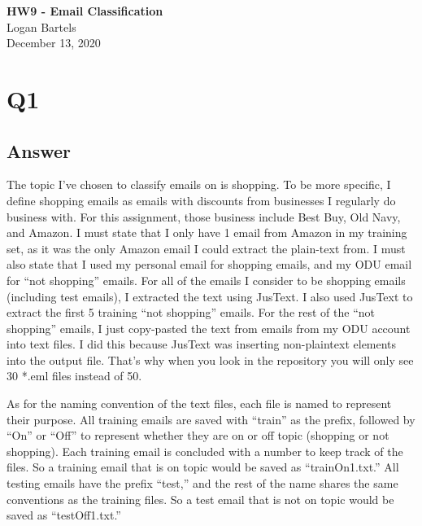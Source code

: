 \documentclass[12pt]{article}
\begin{document}
\begin{centering}
{\large\textbf{HW9 - Email Classification}}\\ %
Logan Bartels\\                     %
December 13, 2020\\                      %
\end{centering}


\section*{Q1}


\subsection*{Answer}
The topic I've chosen to classify emails on is shopping.  To be more specific, I define shopping emails as emails with discounts from businesses I regularly do business with.  For this assignment, those business include Best Buy, Old Navy, and Amazon.  I must state that I only have 1 email from Amazon in my training set, as it was the only Amazon email I could extract the plain-text from.  I must also state that I used my personal email for shopping emails, and my ODU email for ``not shopping'' emails.  For all of the emails I consider to be shopping emails (including test emails), I extracted the text using JusText. I also used JusText to extract the first 5 training ``not shopping'' emails.  For the rest of the ``not shopping'' emails, I just copy-pasted the text from emails from my ODU account into text files.  I did this because JusText was inserting non-plaintext elements into the output file.  That's why when you look in the repository you will only see 30 *.eml files instead of 50.  

As for the naming convention of the text files, each file is named to represent their purpose.  All training emails are saved with ``train'' as the prefix, followed by ``On'' or ``Off'' to represent whether they are on or off topic (shopping or not shopping).  Each training email is concluded with a number to keep track of the files.  So a training email that is on topic would be saved as ``trainOn1.txt.''  All testing emails have the prefix ``test,'' and the rest of the name shares the same conventions as the training files.  So a test email that is not on topic would be saved as ``testOff1.txt.''
\end{document}
